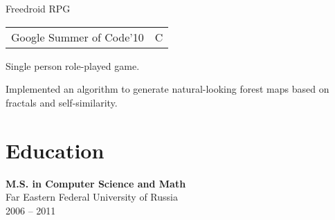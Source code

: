 \documentclass[11pt,a4paper]{article}
\begin{document}
\begin{multicols}{2}
  \begin{project2}{Freedroid RPG}{\begin{tabular}{@{}l|l}Google Summer of Code'10 & C\\\end{tabular}}
    Single person role-played game.
    \begin{items}
    \item Implemented an algorithm to generate natural-looking forest maps
      based on fractals and self-similarity.
    \end{items}
  \end{project2}

\end{multicols}


\section{Education}
\begin{multicols}{2}
  \raggedcolumns
  \begin{items}
  \item \textbf{M.S. in Computer Science and Math}\\
    Far Eastern Federal University of Russia\\
    2006 -- 2011
  \end{items}
  \columnbreak
  \hspace{10mm}
\end{multicols}
\end{document}
